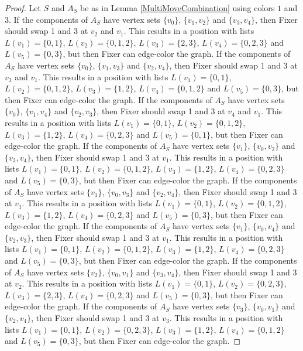 \documentclass[12pt]{amsart}
\theoremstyle{plain}
\theoremstyle{definition}
\theoremstyle{remark}
\begin{document}
\begin{proof}
Let $S$ and $A_S$ be as in Lemma \ref{MultiMoveCombination} using colors $1$ and $3$. If the components of $A_S$ have vertex sets $\{v_0\}$, $\{v_1, v_2\}$ and $\{v_3, v_4\}$, then Fixer should swap 1 and 3 at $v_2$ and $v_1$. This results in a position with lists $L(v_1) = \{0, 1\}$, $L(v_2) = \{0, 1, 2\}$, $L(v_3) = \{2, 3\}$, $L(v_4) = \{0, 2, 3\}$ and $L(v_5) = \{0, 3\}$, but then Fixer can edge-color the graph.
If the components of $A_S$ have vertex sets $\{v_0\}$, $\{v_1, v_3\}$ and $\{v_2, v_4\}$, then Fixer should swap 1 and 3 at $v_3$ and $v_1$. This results in a position with lists $L(v_1) = \{0, 1\}$, $L(v_2) = \{0, 1, 2\}$, $L(v_3) = \{1, 2\}$, $L(v_4) = \{0, 1, 2\}$ and $L(v_5) = \{0, 3\}$, but then Fixer can edge-color the graph.
If the components of $A_S$ have vertex sets $\{v_0\}$, $\{v_1, v_4\}$ and $\{v_2, v_3\}$, then Fixer should swap 1 and 3 at $v_4$ and $v_1$. This results in a position with lists $L(v_1) = \{0, 1\}$, $L(v_2) = \{0, 1, 2\}$, $L(v_3) = \{1, 2\}$, $L(v_4) = \{0, 2, 3\}$ and $L(v_5) = \{0, 1\}$, but then Fixer can edge-color the graph.
If the components of $A_S$ have vertex sets $\{v_1\}$, $\{v_0, v_2\}$ and $\{v_3, v_4\}$, then Fixer should swap 1 and 3 at $v_1$. This results in a position with lists $L(v_1) = \{0, 1\}$, $L(v_2) = \{0, 1, 2\}$, $L(v_3) = \{1, 2\}$, $L(v_4) = \{0, 2, 3\}$ and $L(v_5) = \{0, 3\}$, but then Fixer can edge-color the graph.
If the components of $A_S$ have vertex sets $\{v_1\}$, $\{v_0, v_3\}$ and $\{v_2, v_4\}$, then Fixer should swap 1 and 3 at $v_1$. This results in a position with lists $L(v_1) = \{0, 1\}$, $L(v_2) = \{0, 1, 2\}$, $L(v_3) = \{1, 2\}$, $L(v_4) = \{0, 2, 3\}$ and $L(v_5) = \{0, 3\}$, but then Fixer can edge-color the graph.
If the components of $A_S$ have vertex sets $\{v_1\}$, $\{v_0, v_4\}$ and $\{v_2, v_3\}$, then Fixer should swap 1 and 3 at $v_1$. This results in a position with lists $L(v_1) = \{0, 1\}$, $L(v_2) = \{0, 1, 2\}$, $L(v_3) = \{1, 2\}$, $L(v_4) = \{0, 2, 3\}$ and $L(v_5) = \{0, 3\}$, but then Fixer can edge-color the graph.
If the components of $A_S$ have vertex sets $\{v_2\}$, $\{v_0, v_1\}$ and $\{v_3, v_4\}$, then Fixer should swap 1 and 3 at $v_2$. This results in a position with lists $L(v_1) = \{0, 1\}$, $L(v_2) = \{0, 2, 3\}$, $L(v_3) = \{2, 3\}$, $L(v_4) = \{0, 2, 3\}$ and $L(v_5) = \{0, 3\}$, but then Fixer can edge-color the graph.
If the components of $A_S$ have vertex sets $\{v_3\}$, $\{v_0, v_1\}$ and $\{v_2, v_4\}$, then Fixer should swap 1 and 3 at $v_3$. This results in a position with lists $L(v_1) = \{0, 1\}$, $L(v_2) = \{0, 2, 3\}$, $L(v_3) = \{1, 2\}$, $L(v_4) = \{0, 1, 2\}$ and $L(v_5) = \{0, 3\}$, but then Fixer can edge-color the graph.

\end{proof}
\end{document}
